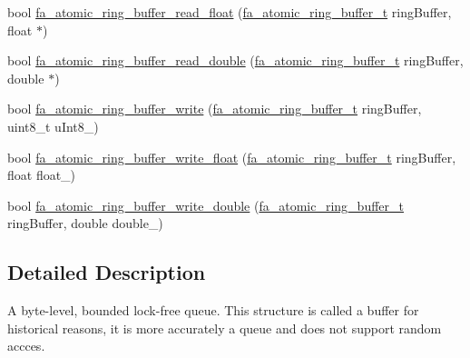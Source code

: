 \begin{DoxyCompactItemize}
\item 
bool \hyperlink{group___fa_atomic_ring_buffer_ga82065e6a2a97af64680ff8baff425ee1}{fa\-\_\-atomic\-\_\-ring\-\_\-buffer\-\_\-read\-\_\-float} (\hyperlink{group___fa_atomic_ring_buffer_ga3482421740e66f489d94407a0d48a2d0}{fa\-\_\-atomic\-\_\-ring\-\_\-buffer\-\_\-t} ring\-Buffer, float $\ast$)
\item 
bool \hyperlink{group___fa_atomic_ring_buffer_ga1599406f0bb153334cd10ae90ab919f1}{fa\-\_\-atomic\-\_\-ring\-\_\-buffer\-\_\-read\-\_\-double} (\hyperlink{group___fa_atomic_ring_buffer_ga3482421740e66f489d94407a0d48a2d0}{fa\-\_\-atomic\-\_\-ring\-\_\-buffer\-\_\-t} ring\-Buffer, double $\ast$)
\item 
bool \hyperlink{group___fa_atomic_ring_buffer_ga18a7f61a001df0e2606280a9aead1ddf}{fa\-\_\-atomic\-\_\-ring\-\_\-buffer\-\_\-write} (\hyperlink{group___fa_atomic_ring_buffer_ga3482421740e66f489d94407a0d48a2d0}{fa\-\_\-atomic\-\_\-ring\-\_\-buffer\-\_\-t} ring\-Buffer, uint8\-\_\-t u\-Int8\-\_\-)
\item 
bool \hyperlink{group___fa_atomic_ring_buffer_gade9d350cfae7b805353a3b58b9d17a7e}{fa\-\_\-atomic\-\_\-ring\-\_\-buffer\-\_\-write\-\_\-float} (\hyperlink{group___fa_atomic_ring_buffer_ga3482421740e66f489d94407a0d48a2d0}{fa\-\_\-atomic\-\_\-ring\-\_\-buffer\-\_\-t} ring\-Buffer, float float\-\_\-)
\item 
bool \hyperlink{group___fa_atomic_ring_buffer_gafd68caebbb7b3f6e62f604a6e6915e90}{fa\-\_\-atomic\-\_\-ring\-\_\-buffer\-\_\-write\-\_\-double} (\hyperlink{group___fa_atomic_ring_buffer_ga3482421740e66f489d94407a0d48a2d0}{fa\-\_\-atomic\-\_\-ring\-\_\-buffer\-\_\-t} ring\-Buffer, double double\-\_\-)
\end{DoxyCompactItemize}


\subsection{Detailed Description}
A byte-\/level, bounded lock-\/free queue. This structure is called a buffer for historical reasons, it is more accurately a queue and does not support random accces.

